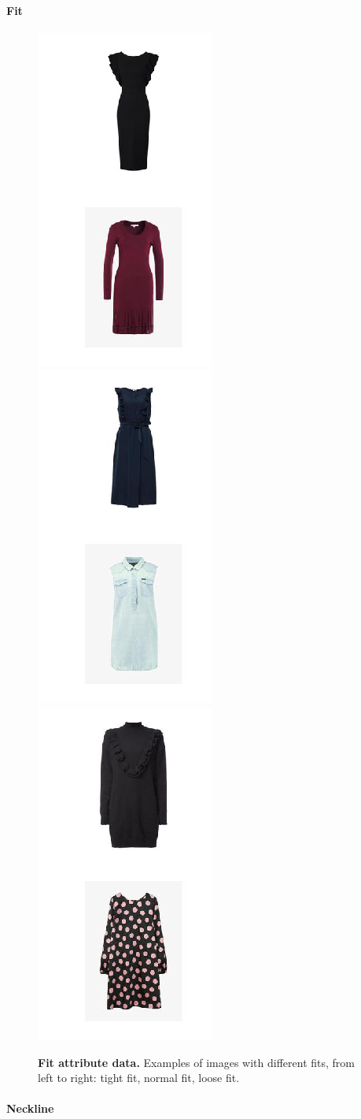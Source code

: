 \documentclass[12pt]{report}
\begin{document}
\pagebreak
\paragraph{Fit}

\begin{figure}[h]
\centering
{\includegraphics[width=.23\linewidth]{03_analysis/data/fit_tight}}
{\includegraphics[width=.23\linewidth]{03_analysis/data/fit_normal}}
{\includegraphics[width=.23\linewidth]{03_analysis/data/fit_loose}}
\caption{\label{fig:fit_data} \textbf{Fit attribute data.} Examples of images with different fits, from left to right: tight fit, normal fit, loose fit.}
\end{figure}

\pagebreak
\paragraph{Neckline}
\end{document}
